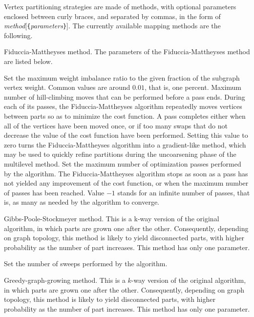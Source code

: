 Vertex partitioning strategies are made of methods, with optional
parameters enclosed between curly braces, and separated by commas, in
the form of {\it method\/}{[{\tt \{}{\it parameters\/}{\tt \}}]}\enspace.
The currently available mapping methods are the following.

\begin{itemize}
\iteme[{\tt f}]
Fiduccia-Mattheyses method. The parameters of the Fiduccia-Mattheyses method
are listed below.
\begin{itemize}
\iteme[{\tt bal=}{\it rat}]
Set the maximum weight imbalance ratio to the given fraction of
the subgraph vertex weight. Common values are around $0.01$, that
is, one percent.
\iteme[{\tt move=}{\it nbr}]
Maximum number of hill-climbing moves that can be performed before a
pass ends. During each of its passes, the Fiduccia-Mattheyses
algorithm repeatedly moves vertices between parts so as to
minimize the cost function. A pass completes either when all of the
vertices have been moved once, or if too many swaps that do not
decrease the value of the cost function have been performed. Setting
this value to zero turns the Fiduccia-Mattheyses algorithm into a
gradient-like method, which may be used to quickly refine partitions
during the uncoarsening phase of the multilevel method.
\iteme[{\tt pass=}{\it nbr}]
Set the maximum number of optimization passes performed by the
algorithm. The Fiduccia-Mattheyses algorithm stops as soon as a pass
has not yielded any improvement of the cost function, or when the
maximum number of passes has been reached. Value $-1$ stands for an
infinite number of passes, that is, as many as needed by the algorithm
to converge.
\end{itemize}
\iteme[{\tt g}]
Gibbs-Poole-Stockmeyer method. This is a k-way version of the
original algorithm, in which parts are grown one after the
other. Consequently, depending on graph topology, this method is
likely to yield disconnected parts, with higher probability as the
number of part increases. This method has only one parameter.
\begin{itemize}
\iteme[{\tt pass=}{\it nbr}]
Set the number of sweeps performed by the algorithm.
\end{itemize}
\iteme[{\tt h}]
Greedy-graph-growing method. This is a $k$-way version of the
original algorithm, in which parts are grown one after the
other. Consequently, depending on graph topology, this method is
likely to yield disconnected parts, with higher probability as the
number of part increases. This method has only one parameter.

\end{itemize}
